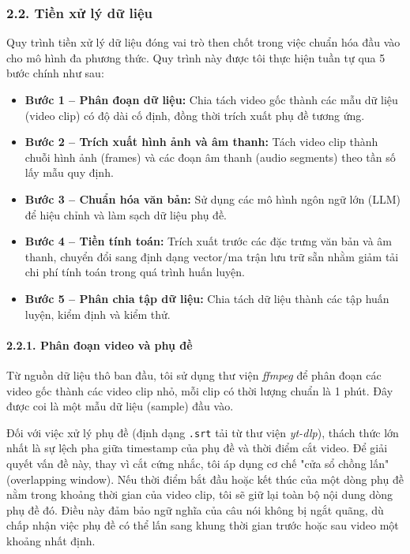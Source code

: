 \subsubsection{2.2. Tiền xử lý dữ liệu}
\indent\indent Quy trình tiền xử lý dữ liệu đóng vai trò then chốt trong việc chuẩn hóa đầu vào cho mô hình đa phương thức. Quy trình này được tôi thực hiện tuần tự qua 5 bước chính như sau:\vspace{-0.1cm}
\begin{itemize}[label={--}, itemsep=1pt]
    \item \textbf{Bước 1 -- Phân đoạn dữ liệu:} Chia tách video gốc thành các mẫu dữ liệu (video clip) có độ dài cố định, đồng thời trích xuất phụ đề tương ứng.
    \item \textbf{Bước 2 -- Trích xuất hình ảnh và âm thanh:} Tách video clip thành chuỗi hình ảnh (frames) và các đoạn âm thanh (audio segments) theo tần số lấy mẫu quy định.
    \item \textbf{Bước 3 -- Chuẩn hóa văn bản:} Sử dụng các mô hình ngôn ngữ lớn (LLM) để hiệu chỉnh và làm sạch dữ liệu phụ đề.
    \item \textbf{Bước 4 -- Tiền tính toán:} Trích xuất trước các đặc trưng văn bản và âm thanh, chuyển đổi sang định dạng vector/ma trận lưu trữ sẵn nhằm giảm tải chi phí tính toán trong quá trình huấn luyện.
    \item \textbf{Bước 5 -- Phân chia tập dữ liệu:} Chia tách dữ liệu thành các tập huấn luyện, kiểm định và kiểm thử.
\end{itemize}
\paragraph{2.2.1. Phân đoạn video và phụ đề}
\indent\indent Từ nguồn dữ liệu thô ban đầu, tôi sử dụng thư viện \textit{ffmpeg} để phân đoạn các video gốc thành các video clip nhỏ, mỗi clip có thời lượng chuẩn là 1 phút. Đây được coi là một mẫu dữ liệu (sample) đầu vào.\vspace{0.3cm}

Đối với việc xử lý phụ đề (định dạng \texttt{.srt} tải từ thư viện \textit{yt-dlp}), thách thức lớn nhất là sự lệch pha giữa timestamp của phụ đề và thời điểm cắt video. Để giải quyết vấn đề này, thay vì cắt cứng nhắc, tôi áp dụng cơ chế "cửa sổ chồng lấn" (overlapping window). Nếu thời điểm bắt đầu hoặc kết thúc của một dòng phụ đề nằm trong khoảng thời gian của video clip, tôi sẽ giữ lại toàn bộ nội dung dòng phụ đề đó. Điều này đảm bảo ngữ nghĩa của câu nói không bị ngắt quãng, dù chấp nhận việc phụ đề có thể lấn sang khung thời gian trước hoặc sau video một khoảng nhất định.\vspace{0.3cm}

